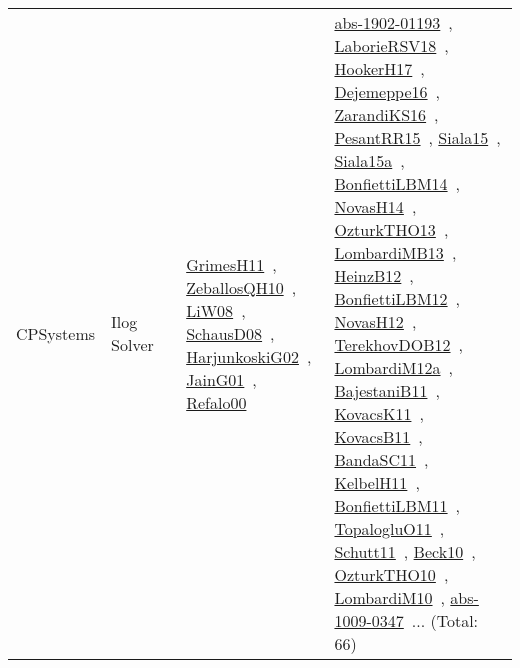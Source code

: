 {\begin{longtable}{lp{3cm}>{\raggedright\arraybackslash}p{6cm}>{\raggedright\arraybackslash}p{6cm}>{\raggedright\arraybackslash}p{8cm}}
CPSystems & Ilog Solver &  & \href{../works/GrimesH11.pdf}{GrimesH11}~\cite{GrimesH11}, \href{../works/ZeballosQH10.pdf}{ZeballosQH10}~\cite{ZeballosQH10}, \href{../works/LiW08.pdf}{LiW08}~\cite{LiW08}, \href{../works/SchausD08.pdf}{SchausD08}~\cite{SchausD08}, \href{../works/HarjunkoskiG02.pdf}{HarjunkoskiG02}~\cite{HarjunkoskiG02}, \href{../works/JainG01.pdf}{JainG01}~\cite{JainG01}, \href{../works/Refalo00.pdf}{Refalo00}~\cite{Refalo00} & \href{../works/abs-1902-01193.pdf}{abs-1902-01193}~\cite{abs-1902-01193}, \href{../works/LaborieRSV18.pdf}{LaborieRSV18}~\cite{LaborieRSV18}, \href{../works/HookerH17.pdf}{HookerH17}~\cite{HookerH17}, \href{../works/Dejemeppe16.pdf}{Dejemeppe16}~\cite{Dejemeppe16}, \href{../works/ZarandiKS16.pdf}{ZarandiKS16}~\cite{ZarandiKS16}, \href{../works/PesantRR15.pdf}{PesantRR15}~\cite{PesantRR15}, \href{../works/Siala15.pdf}{Siala15}~\cite{Siala15}, \href{../works/Siala15a.pdf}{Siala15a}~\cite{Siala15a}, \href{../works/BonfiettiLBM14.pdf}{BonfiettiLBM14}~\cite{BonfiettiLBM14}, \href{../works/NovasH14.pdf}{NovasH14}~\cite{NovasH14}, \href{../works/OzturkTHO13.pdf}{OzturkTHO13}~\cite{OzturkTHO13}, \href{../works/LombardiMB13.pdf}{LombardiMB13}~\cite{LombardiMB13}, \href{../works/HeinzB12.pdf}{HeinzB12}~\cite{HeinzB12}, \href{../works/BonfiettiLBM12.pdf}{BonfiettiLBM12}~\cite{BonfiettiLBM12}, \href{../works/NovasH12.pdf}{NovasH12}~\cite{NovasH12}, \href{../works/TerekhovDOB12.pdf}{TerekhovDOB12}~\cite{TerekhovDOB12}, \href{../works/LombardiM12a.pdf}{LombardiM12a}~\cite{LombardiM12a}, \href{../works/BajestaniB11.pdf}{BajestaniB11}~\cite{BajestaniB11}, \href{../works/KovacsK11.pdf}{KovacsK11}~\cite{KovacsK11}, \href{../works/KovacsB11.pdf}{KovacsB11}~\cite{KovacsB11}, \href{../works/BandaSC11.pdf}{BandaSC11}~\cite{BandaSC11}, \href{../works/KelbelH11.pdf}{KelbelH11}~\cite{KelbelH11}, \href{../works/BonfiettiLBM11.pdf}{BonfiettiLBM11}~\cite{BonfiettiLBM11}, \href{../works/TopalogluO11.pdf}{TopalogluO11}~\cite{TopalogluO11}, \href{../works/Schutt11.pdf}{Schutt11}~\cite{Schutt11}, \href{../works/Beck10.pdf}{Beck10}~\cite{Beck10}, \href{../works/OzturkTHO10.pdf}{OzturkTHO10}~\cite{OzturkTHO10}, \href{../works/LombardiM10.pdf}{LombardiM10}~\cite{LombardiM10}, \href{../works/abs-1009-0347.pdf}{abs-1009-0347}~\cite{abs-1009-0347}... (Total: 66)\\

\end{longtable}}
